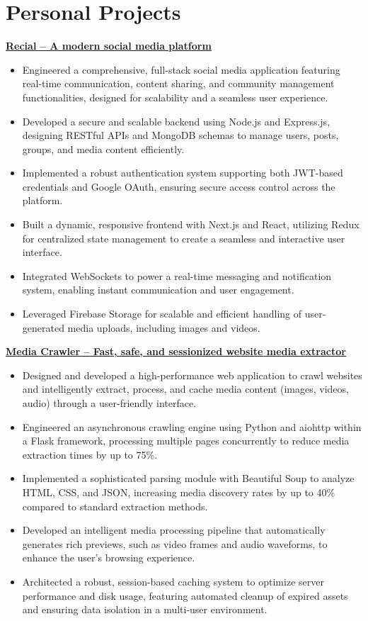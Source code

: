 \documentclass[a4paper,11pt]{article}
\begin{document}
\section*{Personal Projects}
\textbf{\href{https://github.com/NgnPhamGiaHuy/recial-social-media-platform}{Recial – A modern social media platform}}
\begin{itemize}[leftmargin=*, noitemsep, topsep=0pt, partopsep=0pt, parsep=0pt, itemsep=0pt]
    \item Engineered a comprehensive, full-stack social media application featuring real-time communication, content sharing, and community management functionalities, designed for scalability and a seamless user experience.
    \item Developed a secure and scalable backend using Node.js and Express.js, designing RESTful APIs and MongoDB schemas to manage users, posts, groups, and media content efficiently.
    \item Implemented a robust authentication system supporting both JWT-based credentials and Google OAuth, ensuring secure access control across the platform.
    \item Built a dynamic, responsive frontend with Next.js and React, utilizing Redux for centralized state management to create a seamless and interactive user interface.
    \item Integrated WebSockets to power a real-time messaging and notification system, enabling instant communication and user engagement.
    \item Leveraged Firebase Storage for scalable and efficient handling of user-generated media uploads, including images and videos.
\end{itemize}
\textbf{\href{https://github.com/NgnPhamGiaHuy/media-crawler}{Media Crawler – Fast, safe, and sessionized website media extractor}}
\begin{itemize}[leftmargin=*, noitemsep, topsep=0pt, partopsep=0pt, parsep=0pt, itemsep=0pt]
    \item Designed and developed a high-performance web application to crawl websites and intelligently extract, process, and cache media content (images, videos, audio) through a user-friendly interface.
    \item Engineered an asynchronous crawling engine using Python and aiohttp within a Flask framework, processing multiple pages concurrently to reduce media extraction times by up to 75\%.
    \item Implemented a sophisticated parsing module with Beautiful Soup to analyze HTML, CSS, and JSON, increasing media discovery rates by up to 40\% compared to standard extraction methods.
    \item Developed an intelligent media processing pipeline that automatically generates rich previews, such as video frames and audio waveforms, to enhance the user's browsing experience.
    \item Architected a robust, session-based caching system to optimize server performance and disk usage, featuring automated cleanup of expired assets and ensuring data isolation in a multi-user environment.
\end{itemize}
\end{document}
